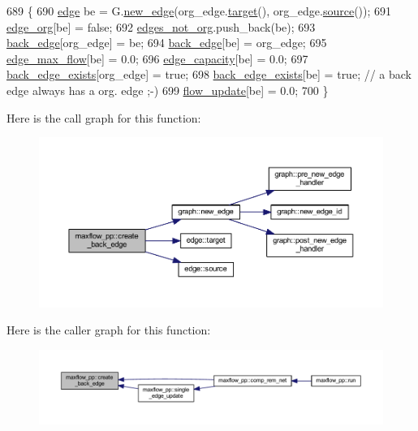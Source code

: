 \begin{DoxyCode}
689 \{
690     \mbox{\hyperlink{classedge}{edge}} be = G.\mbox{\hyperlink{classgraph_a02a0c3a219f75d68caa408ef339d4a1c}{new\_edge}}(org\_edge.\mbox{\hyperlink{classedge_a97563b611261478ee19c6ce055f1a3ee}{target}}(), org\_edge.\mbox{\hyperlink{classedge_ae82d5701f7e6f71edc3c8b0e34bcd2b7}{source}}());
691     \mbox{\hyperlink{classmaxflow__pp_aca9ce457300e11b97cec3446315fda1c}{edge\_org}}[be] = \textcolor{keyword}{false};
692     \mbox{\hyperlink{classmaxflow__pp_ad2cae6d52735a83abc830ce518843a31}{edges\_not\_org}}.push\_back(be);
693     \mbox{\hyperlink{classmaxflow__pp_a9fdef5a86459eaf9634737094f3de250}{back\_edge}}[org\_edge] = be;
694     \mbox{\hyperlink{classmaxflow__pp_a9fdef5a86459eaf9634737094f3de250}{back\_edge}}[be] = org\_edge;
695     \mbox{\hyperlink{classmaxflow__pp_a25d5bb2ab6c775a634dacf408ff55a83}{edge\_max\_flow}}[be] = 0.0;
696     \mbox{\hyperlink{classmaxflow__pp_af3cdc4999a86322271a80b1855d58629}{edge\_capacity}}[be] = 0.0;
697     \mbox{\hyperlink{classmaxflow__pp_a50e9c82f1e720b8340ea4dc6d438f110}{back\_edge\_exists}}[org\_edge] = \textcolor{keyword}{true};
698     \mbox{\hyperlink{classmaxflow__pp_a50e9c82f1e720b8340ea4dc6d438f110}{back\_edge\_exists}}[be] = \textcolor{keyword}{true};    \textcolor{comment}{// a back edge always has a org. edge ;-)}
699     \mbox{\hyperlink{classmaxflow__pp_ad37aff831935b2cfd4b03bc4a6da06ce}{flow\_update}}[be] = 0.0;
700 \}
\end{DoxyCode}
Here is the call graph for this function\+:\nopagebreak
\begin{figure}[H]
\begin{center}
\leavevmode
\includegraphics[width=350pt]{classmaxflow__pp_a20abf72dadaac19acb027ff5fa62de2a_cgraph}
\end{center}
\end{figure}
Here is the caller graph for this function\+:\nopagebreak
\begin{figure}[H]
\begin{center}
\leavevmode
\includegraphics[width=350pt]{classmaxflow__pp_a20abf72dadaac19acb027ff5fa62de2a_icgraph}
\end{center}
\end{figure}
